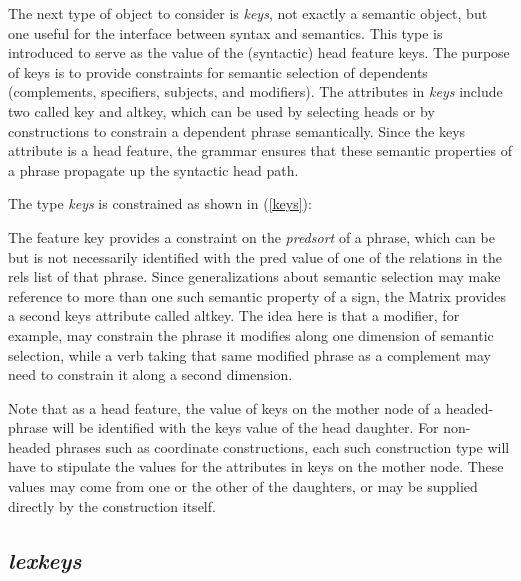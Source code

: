 \documentclass[12pt]{article}
\newcommand{\es}{\enumsentence}
\begin{document}
The next type of object to consider is {\it keys}, not exactly a semantic
object, but one useful for the interface between syntax and semantics.  
This type is
introduced to serve as the value of the (syntactic) {\sc head} feature 
{\sc keys}. 
The purpose of {\sc keys} is to provide constraints for semantic
selection of dependents (complements, specifiers, subjects, and
modifiers).  The attributes in {\it keys} include two called {\sc key}
and {\sc altkey}, which can be used by selecting heads or by constructions
to constrain a dependent phrase semantically.
Since the {\sc keys} attribute is a {\sc head} feature,
the grammar ensures that these semantic properties of a phrase
propagate up the syntactic head path.

The type {\it keys} is constrained as shown in (\ref{keys}):

\es{\label{keys}
\begin{avm}
\[ key & predsort \\
   altkey & predsort \]
\end{avm}
}

The feature {\sc key} provides a constraint on the {\it predsort} of a phrase,
which can be but is not necessarily identified with the {\sc pred} value of one
of the relations in the {\sc rels} list of that phrase.  Since generalizations
about semantic selection may make reference to more than one such semantic
property of a sign, the Matrix provides a second {\sc keys} attribute called
{\sc altkey}.  The idea here is that a modifier, for example, may constrain the
phrase it modifies along one dimension of semantic selection, while a verb
taking that same modified phrase as a complement may need to constrain it along
a second dimension.

Note that as a head feature, the value of {\sc keys} on the mother node of a
headed-phrase will be identified with the {\sc keys} value of the head 
daughter.  For non-headed phrases such as coordinate constructions, each
such construction type will have to stipulate the values for the attributes
in {\sc keys} on the mother node.  These values may come from one or the other
of the daughters, or may be supplied directly by the construction itself.


\subsection{{\it lexkeys}}
\label{lexkeysec}
\end{document}
